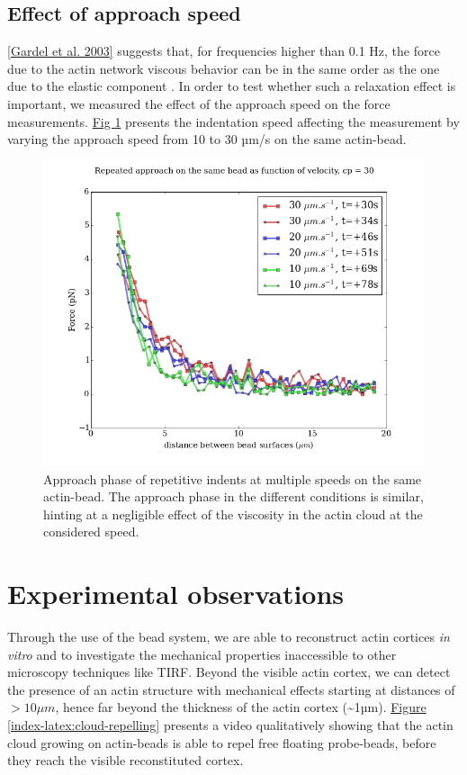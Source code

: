 \documentclass[A4paperpaper,11pt,english]{sphinxmanual}
\begin{document}
\subsection{Effect of approach speed}
\label{index-latex:effect-of-approach-speed}
{\hyperref[index-latex:gardel2003]{{[}Gardel et al. 2003{]}}} suggests that, for frequencies higher than 0.1 Hz, the force due to
the actin network viscous behavior can be in the same order as the one due to the elastic
component . In order to test whether such a relaxation effect is important, we measured the effect of the
approach speed on the force measurements. \hyperref[index-latex:many-speed]{Fig  \ref*{index-latex:many-speed}} presents the
indentation speed affecting the measurement by varying the approach speed from 10
to 30 µm/s on the same actin-bead.
\begin{figure}[htbp]
\centering
\capstart

\includegraphics[width=0.600\linewidth]{many_speed.png}
\caption{Approach phase of repetitive indents at multiple speeds on the same
actin-bead. The approach phase in the different conditions is similar,
hinting at  a negligible effect of the viscosity  in the actin cloud at the
considered speed.}\label{index-latex:many-speed}\end{figure}


\section{Experimental observations}
\label{index-latex:experimental-observations}
Through the use of the bead system, we are able to reconstruct actin cortices \emph{in vitro} and
to investigate the mechanical properties inaccessible to other microscopy
techniques like TIRF. Beyond the visible actin cortex, we can detect the
presence of an actin structure with mechanical effects starting at
distances of \(> 10\mu{}m\), hence far beyond the thickness of the actin cortex (\textasciitilde{}1µm).
\hyperref[index-latex:cloud-repelling]{Figure  \ref*{index-latex:cloud-repelling}} presents a video qualitatively showing that the actin cloud growing
on actin-beads is able to repel free floating probe-beads, before they reach the
visible reconstituted cortex.
\end{document}
